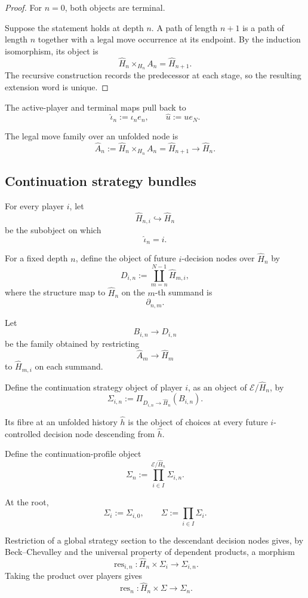 \begin{proof}
For \(n=0\), both objects are terminal.

Suppose the statement holds at depth \(n\). A path of length \(n+1\) is a path of length \(n\)
together with a legal move occurrence at its endpoint. By the induction isomorphism, its object is
\[
  \widehat H_n
  \times_{H_n}
  A_n
  =
  \widehat H_{n+1}.
\]
The recursive construction records the predecessor at each stage, so the resulting extension word
is unique.
\end{proof}

The active-player and terminal maps pull back to
\[
  \widehat\iota_n:=\iota_ne_n,
  \qquad
  \widehat u:=ue_N.
\]

The legal move family over an unfolded node is
\[
  \widehat A_n
  :=
  \widehat H_n\times_{H_n}A_n
  =
  \widehat H_{n+1}
  \longrightarrow
  \widehat H_n.
\]

\subsection{Continuation strategy bundles}

For every player \(i\), let
\[
  \widehat H_{n,i}\hookrightarrow\widehat H_n
\]
be the subobject on which
\[
  \widehat\iota_n=i.
\]

For a fixed depth \(n\), define the object of future \(i\)-decision nodes over
\(\widehat H_n\) by
\[
  D_{i,n}
  :=
  \coprod_{m=n}^{N-1}\widehat H_{m,i},
\]
where the structure map to \(\widehat H_n\) on the \(m\)-th summand is
\[
  \partial_{n,m}.
\]

Let
\[
  B_{i,n}\to D_{i,n}
\]
be the family obtained by restricting
\[
  \widehat A_m\to\widehat H_m
\]
to \(\widehat H_{m,i}\) on each summand.

Define the continuation strategy object of player \(i\), as an object of
\(\mathcal E/\widehat H_n\), by
\[
  \Sigma_{i,n}
  :=
  \Pi_{D_{i,n}\to\widehat H_n}
  (B_{i,n}).
\]

Its fibre at an unfolded history \(\widehat h\) is the object of choices at every future
\(i\)-controlled decision node descending from \(\widehat h\).

Define the continuation-profile object
\[
  \Sigma_n
  :=
  \prod_{i\in I}^{\mathcal E/\widehat H_n}
  \Sigma_{i,n}.
\]

At the root,
\[
  \Sigma_i:=\Sigma_{i,0},
  \qquad
  \Sigma:=\prod_{i\in I}\Sigma_i.
\]

Restriction of a global strategy section to the descendant decision nodes gives, by
Beck--Chevalley and the universal property of dependent products, a morphism
\[
  \operatorname{res}_{i,n}:
  \widehat H_n\times\Sigma_i
  \longrightarrow
  \Sigma_{i,n}.
\]
Taking the product over players gives
\[
  \operatorname{res}_n:
  \widehat H_n\times\Sigma
  \longrightarrow
  \Sigma_n.
\]

